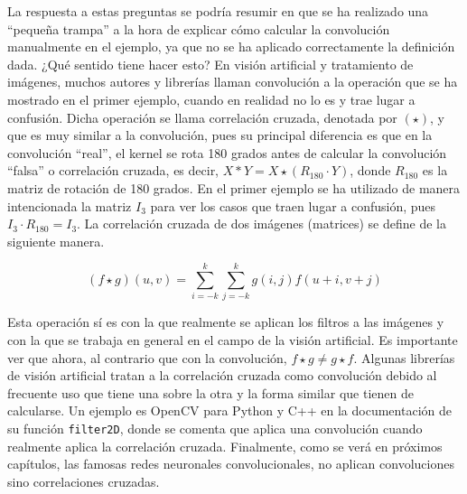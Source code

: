 		La respuesta a estas preguntas se podría resumir en que se ha realizado una ``pequeña trampa'' a la hora de explicar cómo calcular la convolución manualmente en el ejemplo, ya que no se ha aplicado correctamente la definición dada. ¿Qué sentido tiene hacer esto? En visión artificial y tratamiento de imágenes, muchos autores y librerías llaman convolución a la operación que se ha mostrado en el primer ejemplo, cuando en realidad no lo es y trae lugar a confusión. Dicha operación se llama correlación cruzada, denotada por $(\star)$, y que es muy similar a la convolución, pues su principal diferencia es que en la convolución ``real'', el kernel se rota 180 grados antes de calcular la convolución ``falsa'' o correlación cruzada, es decir, $X \ast Y = X \star (R_{180} \cdot Y)$, donde $R_{180}$ es la matriz de rotación de 180 grados. En el primer ejemplo se ha utilizado de manera intencionada la matriz $I_3$ para ver los casos que traen lugar a confusión, pues $I_3 \cdot R_{180} = I_3$. La correlación cruzada de dos imágenes (matrices) se define de la siguiente manera\cite{Goodfellow-et-al-2016}. 
		
		$$
		(f \star g)(u, v) = \sum_{i=-k}^{k}\sum_{j=-k}^{k} g(i, j)f(u + i, v + j)
		$$
		
		Esta operación sí es con la que realmente se aplican los filtros a las imágenes y con la que se trabaja en general en el campo de la visión artificial. Es importante ver que ahora, al contrario que con la convolución, $f \star g \neq g \star f$. Algunas librerías de visión artificial tratan a la correlación cruzada como convolución debido al frecuente uso que tiene una sobre la otra y la forma similar que tienen de calcularse. Un ejemplo es OpenCV para Python y C++ en la documentación de su función \texttt{filter2D}, donde se comenta que aplica una convolución cuando realmente aplica la correlación cruzada\cite{OpenCVFiltering}. Finalmente, como se verá en próximos capítulos, las famosas redes neuronales convolucionales, no aplican convoluciones sino correlaciones cruzadas. 